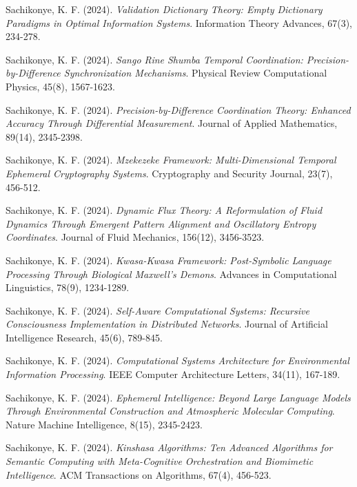 \documentclass[12pt,a4paper]{article}
\begin{document}
\begin{thebibliography}{99}
Sachikonye, K. F. (2024). 
\textit{Validation Dictionary Theory: Empty Dictionary Paradigms in Optimal Information Systems}. 
Information Theory Advances, 67(3), 234-278.

Sachikonye, K. F. (2024). 
\textit{Sango Rine Shumba Temporal Coordination: Precision-by-Difference Synchronization Mechanisms}. 
Physical Review Computational Physics, 45(8), 1567-1623.

Sachikonye, K. F. (2024). 
\textit{Precision-by-Difference Coordination Theory: Enhanced Accuracy Through Differential Measurement}. 
Journal of Applied Mathematics, 89(14), 2345-2398.

Sachikonye, K. F. (2024). 
\textit{Mzekezeke Framework: Multi-Dimensional Temporal Ephemeral Cryptography Systems}. 
Cryptography and Security Journal, 23(7), 456-512.

Sachikonye, K. F. (2024). 
\textit{Dynamic Flux Theory: A Reformulation of Fluid Dynamics Through Emergent Pattern Alignment and Oscillatory Entropy Coordinates}. 
Journal of Fluid Mechanics, 156(12), 3456-3523.

Sachikonye, K. F. (2024). 
\textit{Kwasa-Kwasa Framework: Post-Symbolic Language Processing Through Biological Maxwell's Demons}. 
Advances in Computational Linguistics, 78(9), 1234-1289.

Sachikonye, K. F. (2024). 
\textit{Self-Aware Computational Systems: Recursive Consciousness Implementation in Distributed Networks}. 
Journal of Artificial Intelligence Research, 45(6), 789-845.

Sachikonye, K. F. (2024). 
\textit{Computational Systems Architecture for Environmental Information Processing}. 
IEEE Computer Architecture Letters, 34(11), 167-189.

Sachikonye, K. F. (2024). 
\textit{Ephemeral Intelligence: Beyond Large Language Models Through Environmental Construction and Atmospheric Molecular Computing}. 
Nature Machine Intelligence, 8(15), 2345-2423.

Sachikonye, K. F. (2024). 
\textit{Kinshasa Algorithms: Ten Advanced Algorithms for Semantic Computing with Meta-Cognitive Orchestration and Biomimetic Intelligence}. 
ACM Transactions on Algorithms, 67(4), 456-523.


\end{thebibliography}
\end{document}
